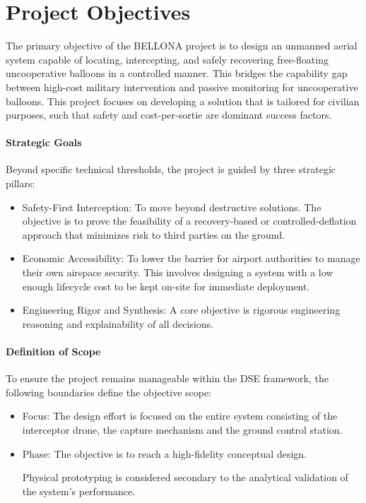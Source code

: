\vspace{-30pt}
\chapter{Project Objectives}
\label{ch:objectives}


The primary objective of the BELLONA project is to design an unmanned aerial system capable of locating, intercepting, and safely recovering free-floating uncooperative balloons in a controlled manner. This bridges the capability gap between high-cost military intervention and passive monitoring for uncooperative balloons. This project focuses on developing a solution that is tailored for civilian purposes, such that safety and cost-per-sortie are dominant success factors.

\vspace{-10pt}

\subsubsection{Strategic Goals}
Beyond specific technical thresholds, the project is guided by three strategic pillars:

\begin{itemize}
    \item Safety-First Interception: To move beyond destructive 
    solutions. The objective is to prove the feasibility of a recovery-based or controlled-deflation approach that minimizes risk to third parties on the ground.
    \item Economic Accessibility: To lower the barrier for airport authorities to manage their own airspace security. This involves designing a system with a low enough lifecycle cost to be kept on-site for immediate deployment.
    \item Engineering Rigor and Synthesis: A core objective is rigorous engineering reasoning and explainability of all decisions.
    
\end{itemize}
\vspace{-10pt}

\subsubsection{Definition of Scope}
To ensure the project remains manageable within the DSE framework, the following boundaries define the objective scope:
\begin{itemize}
    \item Focus: The design effort is focused on the entire system consisting of the interceptor drone, the capture mechanism and the ground control station.
    \item Phase: The objective is to reach a high-fidelity conceptual design. 
    
    Physical prototyping is considered secondary to the analytical validation of the system's performance.
\end{itemize}
\vspace{-10pt}

